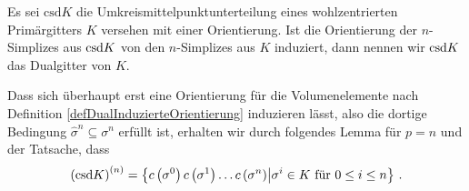     \begin{definition}
      \label{defDualgitter}
      Es sei \( \text{csd}K \) die Umkreismittelpunktunterteilung eines wohlzentrierten Primärgitters \( K \) versehen mit einer Orientierung.
      Ist die Orientierung der \( n \)-Simplizes aus \( \text{csd} K \) von den \( n \)-Simplizes aus \( K \) induziert, dann nennen wir \( \text{csd}
      K \) das Dualgitter von \( K \).
    \end{definition}
    Dass sich überhaupt erst eine Orientierung für die Volumenelemente nach Definition \ref{defDualInduzierteOrientierung} induzieren lässt, 
    also die dortige Bedingung \( \hat{\sigma}^{n} \subseteq \sigma^{n}\) erfüllt ist, erhalten wir durch folgendes Lemma für
    \( p = n \) und der Tatsache, dass 
    \begin{align}
      \left( \text{csd} K \right)^{(n)} = \left\{ c\left( \sigma^{0} \right) c\left( \sigma^{1} \right) \ldots c\left( \sigma^{n} \right) \middle|
                                                                              \sigma^{i}\in K \text { für } 0 \le i \le n    \right\} \,\text{.}
    \end{align}
